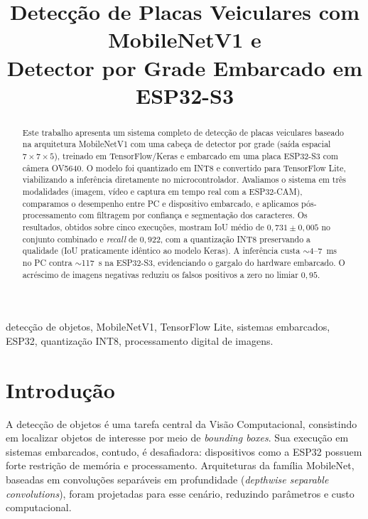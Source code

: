 \documentclass[conference]{IEEEtran}
\begin{document}
\title{Detecção de Placas Veiculares com MobileNetV1 e\\
Detector por Grade Embarcado em ESP32-S3}

\author{
}

\maketitle

\begin{abstract}
Este trabalho apresenta um sistema completo de detecção de placas
veiculares baseado na arquitetura MobileNetV1 com uma cabeça de
detector por grade (saída espacial $7\times7\times5$), treinado em
TensorFlow/Keras e embarcado em uma placa ESP32-S3 com câmera OV5640.
O modelo foi quantizado em INT8 e convertido para TensorFlow Lite, viabilizando a
inferência diretamente no microcontrolador. Avaliamos o sistema em três
modalidades (imagem, vídeo e captura em tempo real com a ESP32-CAM), comparamos o
desempenho entre PC e dispositivo embarcado, e aplicamos pós-processamento com
filtragem por confiança e segmentação dos caracteres. Os resultados, obtidos sobre
cinco execuções, mostram IoU médio de $0{,}731\pm0{,}005$ no conjunto
combinado e \emph{recall} de $0{,}922$, com a quantização INT8 preservando a
qualidade (IoU praticamente idêntico ao modelo Keras). A inferência custa
$\sim$4--7~ms no PC contra $\sim$117~s na ESP32-S3, evidenciando o gargalo do
hardware embarcado. O acréscimo de imagens negativas reduziu os falsos positivos a
zero no limiar $0{,}95$.
\end{abstract}

\begin{IEEEkeywords}
detecção de objetos, MobileNetV1, TensorFlow Lite, sistemas embarcados, ESP32,
quantização INT8, processamento digital de imagens.
\end{IEEEkeywords}

\section{Introdução}
A detecção de objetos é uma tarefa central da Visão Computacional, consistindo em
localizar objetos de interesse por meio de \emph{bounding boxes}. Sua execução em
sistemas embarcados, contudo, é desafiadora: dispositivos como a ESP32 possuem
forte restrição de memória e processamento. Arquiteturas da família MobileNet,
baseadas em convoluções separáveis em profundidade (\emph{depthwise separable
convolutions}), foram projetadas para esse cenário, reduzindo parâmetros e custo
computacional.
\end{document}
